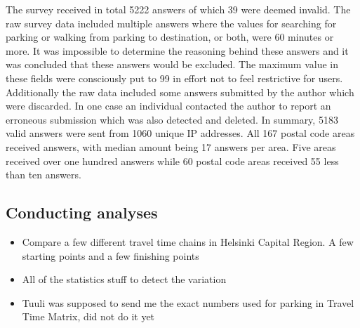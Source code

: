 The survey received in total 5222 answers of which 39 were deemed invalid. The raw survey data included multiple answers where the values for searching for parking or walking from parking to destination, or both, were 60 minutes or more. It was impossible to determine the reasoning behind these answers and it was concluded that these answers would be excluded. The maximum value in these fields were consciously put to 99 in effort not to feel restrictive for users. Additionally the raw data included some answers submitted by the author which were discarded. In one case an individual contacted the author to report an erroneous submission which was also detected and deleted. In summary, 5183 valid answers were sent from 1060 unique IP addresses. All 167 postal code areas received answers, with median amount being 17 answers per area. Five areas received over one hundred answers while 60 postal code areas received 55 less than ten answers.

\subsection{Conducting analyses}
\justify
\begin{itemize}
  \item Compare a few different travel time chains in Helsinki Capital Region. A few starting points and a few finishing points
  \item All of the statistics stuff to detect the variation 
  \item Tuuli was supposed to send me the exact numbers used for parking in Travel Time Matrix, did not do it yet
\end{itemize}